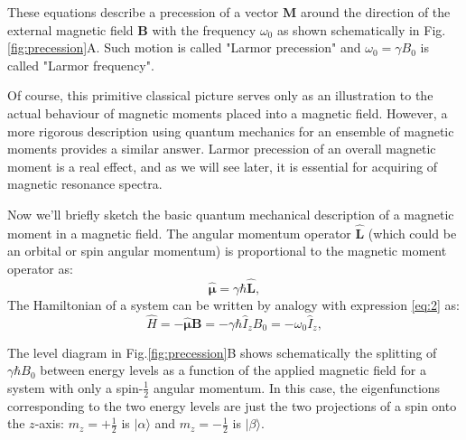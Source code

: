\documentclass{beamer}
\begin{document}
\begin{frame}

	These equations describe a precession of a vector $\bm{M}$ around the direction of the external magnetic field $\bm{B}$ with the frequency $\omega_0$ as shown schematically in Fig.\ref{fig:precession}A. Such motion is called  "Larmor precession" and $\omega_0 = \gamma B_0$ is called "Larmor frequency".
	
	Of course, this primitive classical picture serves only as an illustration to the actual behaviour of magnetic moments placed into a magnetic field. However, a more rigorous description using quantum mechanics for an ensemble of magnetic moments provides a similar answer. Larmor precession of an overall magnetic moment is a real effect, and as we will see later, it is essential for acquiring of magnetic resonance spectra.
	

	
	Now we'll briefly sketch the basic quantum mechanical description of a magnetic moment in a magnetic field.  The angular momentum operator $\bm{\hat{L}}$ (which could be an orbital or spin angular momentum) is proportional to the magnetic moment operator as:
	\begin{equation} \label{eq:3}
	\bm{\hat{\mu}} = \gamma \hbar \bm{\hat{L}},
	\end{equation}
	The Hamiltonian of a system can be written by analogy with expression \ref{eq:2} as:
	\begin{equation} \label{eq:2level}
	\hat{H} = -\bm{\hat{\mu}} \bm{B} = -\gamma \hbar \hat{I}_{z} B_0 = -\omega_0 \hat{I}_{z},
	\end{equation}
	
	The level diagram in Fig.\ref{fig:precession}B shows schematically the splitting of $\gamma \hbar B_0 $ between energy levels  as a function of the applied magnetic field for a system with only a spin-$\frac{1}{2}$ angular momentum. In this case, the eigenfunctions corresponding to the two energy levels are just the two projections of a spin onto the $z$-axis: $m_z=+\frac{1}{2}$ is $\vert \alpha \rangle$ and $m_z=-\frac{1}{2}$ is $\vert \beta \rangle$.
	
	
\end{frame}
\end{document}
